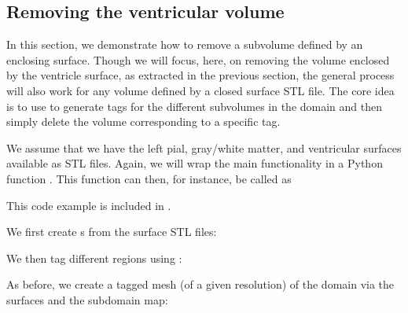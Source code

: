 \subsection{Removing the ventricular volume}
\label{sec:chp4:tools:remove-vent:removal}  
In this section, we demonstrate how to remove a subvolume defined by
an enclosing surface. Though we will focus, here, on removing the
volume enclosed by the ventricle surface, as extracted in the previous
section, the general process will also work for any volume defined by
a closed surface STL file. The core idea is to use \svmtk{} to
generate tags for the different subvolumes in the domain and then
simply delete the volume corresponding to a specific tag.  

We assume that we have the left pial, gray/white matter, and ventricular
surfaces available as STL files. Again, we will wrap the main
functionality in a Python function
. This function can then, for
instance, be called as

\noindent This code example is included in
.

We first create s from the surface STL files:

\noindent We then tag different regions using : 

\noindent As before, we create a tagged mesh (of a given resolution)
of the domain via the surfaces and the subdomain map:

